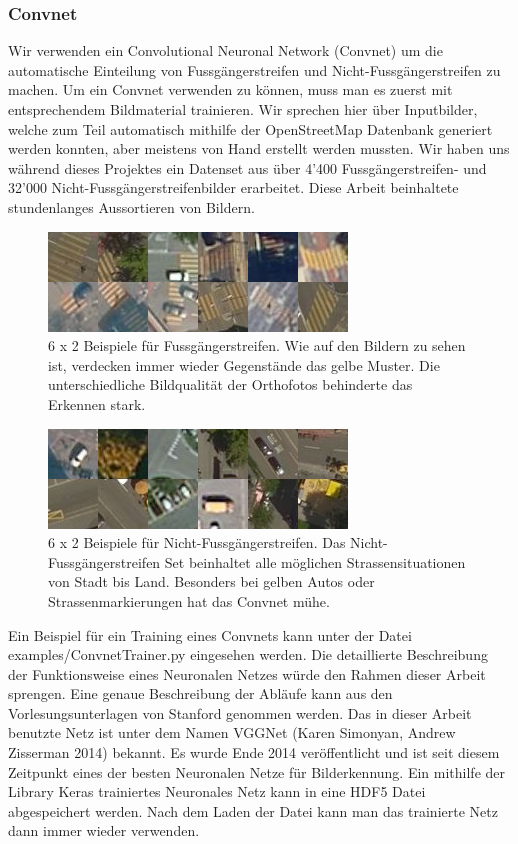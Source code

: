 \subsubsection{Convnet}
Wir verwenden ein Convolutional Neuronal Network (Convnet) um die automatische Einteilung von Fussgängerstreifen und Nicht-Fussgängerstreifen zu machen. Um ein Convnet verwenden zu können, muss man es zuerst mit entsprechendem Bildmaterial trainieren. Wir sprechen hier über Inputbilder, welche zum Teil automatisch mithilfe der OpenStreetMap Datenbank generiert werden konnten, aber meistens von Hand erstellt werden mussten. Wir haben uns während dieses Projektes ein Datenset aus über 4'400 Fussgängerstreifen- und 32'000 Nicht-Fussgängerstreifenbilder erarbeitet. Diese Arbeit beinhaltete stundenlanges Aussortieren von Bildern.
\\

\begin{figure}[H]
	\centering
	\includegraphics{images/Zebrastreifen_examples.png}
	\caption[Beispiele für Fussgängerstreifen]{6 x 2 Beispiele für Fussgängerstreifen. Wie auf den Bildern zu sehen ist, verdecken immer wieder Gegenstände das gelbe Muster. Die unterschiedliche Bildqualität der Orthofotos behinderte das Erkennen stark.}
\end{figure}

\begin{figure}[H]
	\centering
	\includegraphics{images/No_Zebrastreifen_examples.png}
	\caption[Beispiele für Nicht-Fussgängerstreifen]{6 x 2 Beispiele für Nicht-Fussgängerstreifen. Das Nicht-Fussgängerstreifen Set beinhaltet alle möglichen Strassensituationen von Stadt bis Land. Besonders bei gelben Autos oder Strassenmarkierungen hat das Convnet mühe.}
\end{figure}
\medskip
Ein Beispiel für ein Training eines Convnets kann unter der Datei examples/ConvnetTrainer.py eingesehen werden. Die detaillierte Beschreibung der Funktionsweise eines Neuronalen Netzes würde den Rahmen dieser Arbeit sprengen. Eine genaue Beschreibung der Abläufe kann aus den Vorlesungsunterlagen von Stanford \cite{Convolutional} genommen werden. Das in dieser Arbeit benutzte Netz ist unter dem Namen VGGNet (Karen Simonyan, Andrew Zisserman 2014)\cite{Deep} bekannt. Es wurde Ende 2014 veröffentlicht und ist seit diesem Zeitpunkt eines der besten Neuronalen Netze für Bilderkennung. Ein mithilfe der Library Keras trainiertes Neuronales Netz kann in eine HDF5 Datei abgespeichert werden. Nach dem Laden der Datei kann man das trainierte Netz dann immer wieder verwenden.

